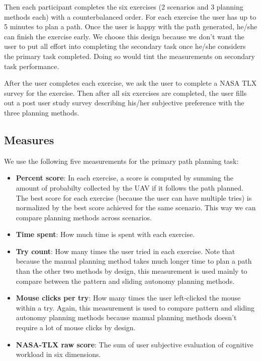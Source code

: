 \documentclass[journal]{IEEEtran}
\begin{document}
Then each participant completes the six exercises (2 scenarios and 3 planning methods each) with a counterbalanced order. For each exercise the user has up to 5 minutes to plan a path. Once the user is happy with the path generated, he/she can finish the exercise early. We choose this design because we don't want the user to put all effort into completing the secondary task once he/she considers the primary task completed. Doing so would tint the measurements on secondary task performance.

After the user completes each exercise, we ask the user to complete a NASA TLX survey for the exercise. Then after all six exercises are completed, the user fills out a post user study survey describing his/her subjective preference with the three planning methods.

\subsection{Measures}

We use the following five measurements for the primary path planning task:

\begin{itemize}
\item \textbf{Percent score}: In each exercise, a score is computed by summing the amount of probabilty collected by the UAV if it follows the path planned. The best score for each exercise (because the user can have multiple tries) is normalized by the best score achieved for the same scenario. This way we can compare planning methods across scenarios.
\item \textbf{Time spent}: How much time is spent with each exercise.
\item \textbf{Try count}: How many times the user tried in each exercise. Note that because the manual planning method takes much longer time to plan a path than the other two methods by design, this measurement is used mainly to compare between the pattern and sliding autonomy planning methods.
\item \textbf{Mouse clicks per try}: How many times the user left-clicked the mouse within a try. Again, this measurement is used to compare pattern and sliding autonomy planning methods because manual planning methods doesn't require a lot of mouse clicks by design.
\item \textbf{NASA-TLX raw score}: The sum of user subjective evaluation of cognitive workload in six dimensions. 
\end{itemize}
\end{document}
